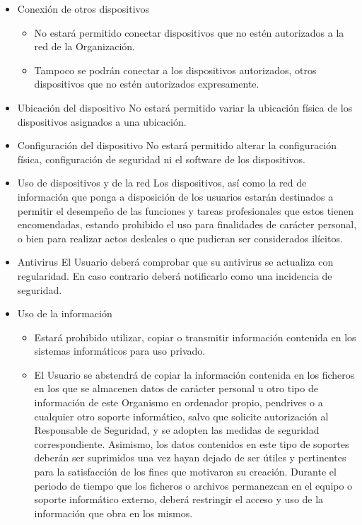 \begin{enumerate}[label=\alph*)]
\begin{itemize}
    \item Conexión de otros dispositivos
    \begin{itemize}
        \item No estará permitido conectar dispositivos que no estén autorizados a la red de la Organización.
        \item Tampoco se podrán conectar a los dispositivos autorizados, otros dispositivos que no estén autorizados expresamente.
    \end{itemize}
    \item Ubicación del dispositivo
    No estará permitido variar la ubicación física de los dispositivos asignados a una ubicación.
    \item Configuración del dispositivo
    No estará permitido alterar la configuración física, configuración de seguridad ni el software de los dispositivos.
    \item Uso de dispositivos y de la red
    Los dispositivos, así como la red de información que \Beneficiario{} ponga a disposición de los usuarios estarán destinados a permitir el desempeño de las funciones y tareas profesionales que estos tienen encomendadas, estando prohibido el uso para finalidades de carácter personal, o bien para realizar actos desleales o que pudieran ser considerados ilícitos.
    \item Antivirus
    El Usuario deberá comprobar que su antivirus se actualiza con regularidad. En caso contrario deberá notificarlo como una incidencia de seguridad.
    \item Uso de la información
    \begin{itemize}
        \item Estará prohibido utilizar, copiar o transmitir información contenida en los sistemas informáticos para uso privado.
        \item El Usuario se abstendrá de copiar la información contenida en los ficheros en los que se almacenen datos de carácter personal u otro tipo de información de este Organismo en ordenador propio, pendrives o a cualquier otro soporte informático, salvo que solicite autorización al Responsable de Seguridad, y se adopten las medidas de seguridad correspondiente. Asimismo, los datos contenidos en este tipo de soportes deberán ser suprimidos una vez hayan dejado de ser útiles y pertinentes para la satisfacción de los fines que motivaron su creación. Durante el periodo de tiempo que los ficheros o archivos permanezcan en el equipo o soporte informático externo, deberá restringir el acceso y uso de la información que obra en los mismos.

\end{itemize}
\end{itemize}
\end{enumerate}
